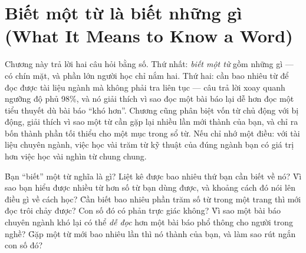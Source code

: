 \documentclass[../../english.tex]{subfiles}
\begin{document}
\chapter{Biết một từ là biết những gì (What It Means to Know a Word)}

\begin{tomtat}
Chương này trả lời hai câu hỏi bằng số. Thứ nhất: \emph{biết một từ} gồm những gì --- có chín mặt, và phần lớn người học chỉ nắm hai. Thứ hai: cần bao nhiêu từ để đọc được tài liệu ngành mà không phải tra liên tục --- câu trả lời xoay quanh ngưỡng độ phủ 98\%, và nó giải thích vì sao đọc một bài báo lại dễ hơn đọc một tiểu thuyết dù bài báo ``khó hơn''. Chương cũng phân biệt vốn từ chủ động với bị động, giải thích vì sao một từ cần gặp lại nhiều lần mới thành của bạn, và chỉ ra bốn thành phần tối thiểu cho một mục trong sổ từ. Nếu chỉ nhớ một điều: với tài liệu chuyên ngành, việc học vài trăm từ kỹ thuật của đúng ngành bạn có giá trị hơn việc học vài nghìn từ chung chung.
\end{tomtat}

\begin{nentang}
\end{nentang}

\begin{khoigoi}
\h{Bạn ``biết'' một từ nghĩa là gì? Liệt kê được bao nhiêu thứ bạn cần biết về nó?}
\h{Vì sao bạn hiểu được nhiều từ hơn số từ bạn dùng được, và khoảng cách đó nói lên điều gì về cách học?}
\h{Cần biết bao nhiêu phần trăm số từ trong một trang thì mới đọc trôi chảy được? Con số đó có phản trực giác không?}
\h{Vì sao một bài báo chuyên ngành khó lại có thể \emph{dễ đọc} hơn một bài báo phổ thông cho người trong nghề?}
\h{Gặp một từ mới bao nhiêu lần thì nó thành của bạn, và làm sao rút ngắn con số đó?}
\end{khoigoi}
\end{document}
